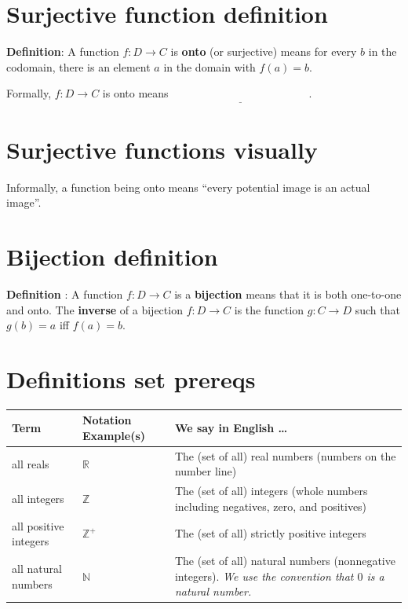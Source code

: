 \documentclass[12pt, oneside]{article}
\begin{document}
\section*{Surjective function definition}


{\bf Definition}: A function $f: D  \to C$ is {\bf onto} (or  surjective) means for every $b$ in the codomain, 
there  is an element $a$ in the domain with  $f(a) = b$.

Formally, $f: D  \to  C$ is  onto  means $\underline{\phantom{\forall b \in C  \exists a \in D ( f(a) = b)}}$.
 \vfill
\section*{Surjective functions visually}


Informally, a function being onto means ``every potential image is an actual image''.

\phantom{Draw finite domain, finite codomain picture with duplicate image.}
\vspace{50pt} \vfill
\section*{Bijection definition}


{\bf Definition} : A function $f: D  \to C$ is a {\bf bijection} means that it is both 
one-to-one  and onto. The {\bf inverse} of a  bijection $f: D  \to  C$ is 
the function $g: C  \to  D$  such that $g(b) = a$ iff  $f(a) =  b$.
 \vfill
\section*{Definitions set prereqs}


\begin{center}
\begin{tabular}{|llp{9.8cm}|}
\hline
{\bf Term} & {\bf Notation Example(s)} & {\bf We say in English \ldots } \\
\hline
all reals & $\mathbb{R}$ & The (set of all) real numbers (numbers on the number line)\\
all integers & $\mathbb{Z}$ & The (set of all) integers (whole numbers including negatives, zero, and positives) \\
all positive integers & $\mathbb{Z}^+$ & The (set of all) strictly positive integers \\
all natural numbers & $\mathbb{N}$ & The (set of all) natural numbers (nonnegative integers). {\it We use the convention that $0$ is a natural number.} \\


\hline
\end{tabular}
\end{center} \vfill
\end{document}

